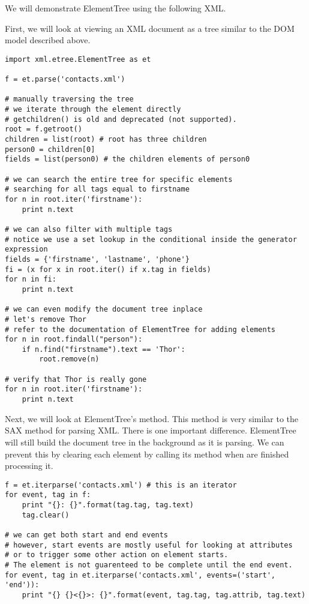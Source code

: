 We will demonstrate ElementTree using the following XML.


First, we will look at viewing an XML document as a tree similar to the DOM model described above.
\begin{lstlisting}
import xml.etree.ElementTree as et

f = et.parse('contacts.xml')

# manually traversing the tree
# we iterate through the element directly
# getchildren() is old and deprecated (not supported).
root = f.getroot()
children = list(root) # root has three children
person0 = children[0]
fields = list(person0) # the children elements of person0

# we can search the entire tree for specific elements
# searching for all tags equal to firstname
for n in root.iter('firstname'):
    print n.text
    
# we can also filter with multiple tags 
# notice we use a set lookup in the conditional inside the generator expression
fields = {'firstname', 'lastname', 'phone'}
fi = (x for x in root.iter() if x.tag in fields)
for n in fi:
    print n.text
    
# we can even modify the document tree inplace
# let's remove Thor
# refer to the documentation of ElementTree for adding elements
for n in root.findall("person"):
    if n.find("firstname").text == 'Thor':
        root.remove(n)

# verify that Thor is really gone
for n in root.iter('firstname'):
    print n.text
\end{lstlisting}

Next, we will look at ElementTree's  method.
This method is very similar to the SAX method for parsing XML.
There is one important difference.
ElementTree will still build the document tree in the background as it is parsing.
We can prevent this by clearing each element by calling its  method when are finished processing it.
\begin{lstlisting}
f = et.iterparse('contacts.xml') # this is an iterator
for event, tag in f:
    print "{}: {}".format(tag.tag, tag.text)
    tag.clear()
    
# we can get both start and end events
# however, start events are mostly useful for looking at attributes
# or to trigger some other action on element starts.
# The element is not guarenteed to be complete until the end event.
for event, tag in et.iterparse('contacts.xml', events=('start', 'end')):
    print "{} {}<{}>: {}".format(event, tag.tag, tag.attrib, tag.text)
\end{lstlisting}


